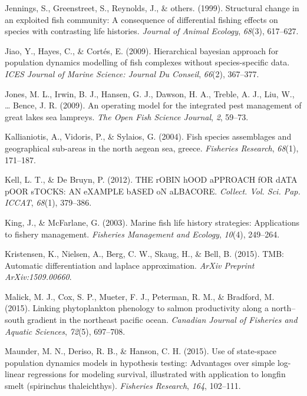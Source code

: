 \documentclass[12pt,]{scrartcl}
\begin{document}
\hypertarget{ref-jennings1999structural}{}
Jennings, S., Greenstreet, S., Reynolds, J., \& others. (1999).
Structural change in an exploited fish community: A consequence of
differential fishing effects on species with contrasting life histories.
\emph{Journal of Animal Ecology}, \emph{68}(3), 617--627.

\hypertarget{ref-jiao2009hierarchical}{}
Jiao, Y., Hayes, C., \& Cortés, E. (2009). Hierarchical bayesian
approach for population dynamics modelling of fish complexes without
species-specific data. \emph{ICES Journal of Marine Science: Journal Du
Conseil}, \emph{66}(2), 367--377.

\hypertarget{ref-jones2009operating}{}
Jones, M. L., Irwin, B. J., Hansen, G. J., Dawson, H. A., Treble, A. J.,
Liu, W., \ldots{} Bence, J. R. (2009). An operating model for the
integrated pest management of great lakes sea lampreys. \emph{The Open
Fish Science Journal}, \emph{2}, 59--73.

\hypertarget{ref-kallianiotis2004fish}{}
Kallianiotis, A., Vidoris, P., \& Sylaios, G. (2004). Fish species
assemblages and geographical sub-areas in the north aegean sea, greece.
\emph{Fisheries Research}, \emph{68}(1), 171--187.

\hypertarget{ref-kell2012robin}{}
Kell, L. T., \& De Bruyn, P. (2012). THE rOBIN hOOD aPPROACH fOR dATA
pOOR sTOCKS: AN eXAMPLE bASED oN aLBACORE. \emph{Collect. Vol. Sci. Pap.
ICCAT}, \emph{68}(1), 379--386.

\hypertarget{ref-king2003marine}{}
King, J., \& McFarlane, G. (2003). Marine fish life history strategies:
Applications to fishery management. \emph{Fisheries Management and
Ecology}, \emph{10}(4), 249--264.

\hypertarget{ref-kristensen2015tmb}{}
Kristensen, K., Nielsen, A., Berg, C. W., Skaug, H., \& Bell, B. (2015).
TMB: Automatic differentiation and laplace approximation. \emph{ArXiv
Preprint ArXiv:1509.00660}.

\hypertarget{ref-malick2015linking}{}
Malick, M. J., Cox, S. P., Mueter, F. J., Peterman, R. M., \& Bradford,
M. (2015). Linking phytoplankton phenology to salmon productivity along
a north--south gradient in the northeast pacific ocean. \emph{Canadian
Journal of Fisheries and Aquatic Sciences}, \emph{72}(5), 697--708.

\hypertarget{ref-maunder2015use}{}
Maunder, M. N., Deriso, R. B., \& Hanson, C. H. (2015). Use of
state-space population dynamics models in hypothesis testing: Advantages
over simple log-linear regressions for modeling survival, illustrated
with application to longfin smelt (spirinchus thaleichthys).
\emph{Fisheries Research}, \emph{164}, 102--111.
\end{document}
